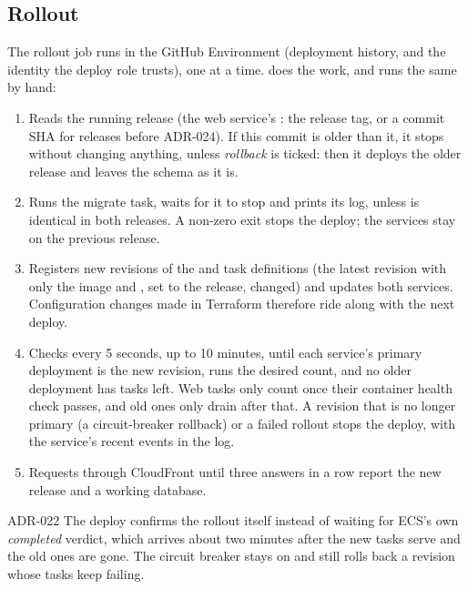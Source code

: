 \subsection{Rollout}
The rollout job runs in the  GitHub Environment (deployment history, and the
identity the deploy role trusts), one at a time.  does the work, and runs
the same by hand:
\begin{enumerate}
  \item Reads the running release (the web service's : the release tag, or a
    commit SHA for releases before ADR-024). If this commit is older than it, it stops without
    changing anything, unless \emph{rollback} is ticked: then it deploys the older release and
    leaves the schema as it is.
  \item Runs the migrate task, waits for it to stop and prints its log, unless
     is identical in both releases. A non-zero exit stops the deploy; the
    services stay on the previous release.
  \item Registers new revisions of the  and  task definitions
    (the latest revision with only the image and , set to the release, changed) and updates both
    services. Configuration changes made in Terraform therefore ride along with the next deploy.
  \item Checks every 5 seconds, up to 10 minutes, until each service's primary deployment is the
    new revision, runs the desired count, and no older deployment has tasks left. Web tasks only
    count once their container health check passes, and old ones only drain after that. A
    revision that is no longer primary (a circuit-breaker rollback) or a failed rollout stops the
    deploy, with the service's recent events in the log.
  \item Requests  through CloudFront until three answers in a row report the new
    release and a working database.
\end{enumerate}

\begin{decision}{ADR-022}
  The deploy confirms the rollout itself instead of waiting for ECS's own \emph{completed}
  verdict, which arrives about two minutes after the new tasks serve and the old ones are gone.
  The circuit breaker stays on and still rolls back a revision whose tasks keep failing.
\end{decision}

